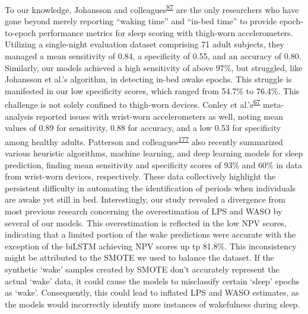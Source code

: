 \documentclass[
  10pt,
]{scrbook}
\begin{document}
To our knowledge, Johansson and
colleagues\textsuperscript{\protect\hyperlink{ref-johansson_development_2023}{87}}
are the only researchers who have gone beyond merely reporting ``waking
time'' and ``in-bed time'' to provide epoch-to-epoch performance metrics
for sleep scoring with thigh-worn accelerometers. Utilizing a
single-night evaluation dataset comprising 71 adult subjects, they
managed a mean sensitivity of 0.84, a specificity of 0.55, and an
accuracy of 0.80. Similarly, our models achieved a high sensitivity of
above 97\%, but struggled, like Johansson et al.'s algorithm, in
detecting in-bed awake epochs. This struggle is manifested in our low
specificity scores, which ranged from 54.7\% to 76.4\%. This challenge
is not solely confined to thigh-worn devices. Conley et
al.'s\textsuperscript{\protect\hyperlink{ref-conley_agreement_2019}{67}}
meta-analysis reported issues with wrist-worn accelerometers as well,
noting mean values of 0.89 for sensitivity, 0.88 for accuracy, and a low
0.53 for specificity among healthy adults. Patterson and
colleagues\textsuperscript{\protect\hyperlink{ref-patterson_40_2023}{177}}
also recently summarized various heuristic algorithms, machine learning,
and deep learning models for sleep prediction, finding mean sensitivity
and specificity scores of 93\% and 60\% in data from wrist-worn devices,
respectively. These data collectively highlight the persistent
difficulty in automating the identification of periods when individuals
are awake yet still in bed. Interestingly, our study revealed a
divergence from most previous research concerning the overestimation of
LPS and WASO by several of our models. This overestimation is reflected
in the low NPV scores, indicating that a limited portion of the wake
predictions were accurate with the exception of the biLSTM achieving NPV
scores up tp 81.8\%. This inconsistency might be attributed to the SMOTE
we used to balance the dataset. If the synthetic `wake' samples created
by SMOTE don't accurately represent the actual `wake' data, it could
cause the models to misclassify certain `sleep' epochs as `wake'.
Consequently, this could lead to inflated LPS and WASO estimates, as the
models would incorrectly identify more instances of wakefulness during
sleep.
\end{document}
